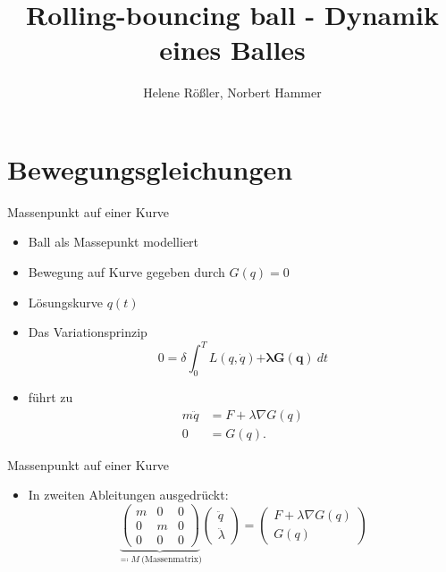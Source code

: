 \documentclass[aspectratio=169]{beamer}
\title{Rolling-bouncing ball - Dynamik eines Balles}
\author{Helene Rößler, Norbert Hammer}
\date{}
\begin{document}
\maketitle

\section{Bewegungsgleichungen}

\begin{frame}{Massenpunkt auf einer Kurve}
\begin{itemize}
    \item Ball als Massepunkt modelliert
    \item Bewegung auf Kurve gegeben durch $G(q)=0$
    \item Lösungskurve $q(t)$
    \item Das Variationsprinzip
    \begin{equation*}
        0 = \delta \int_0^T L(q, \dot{q}) \boldsymbol{ + \lambda G(q)} \ dt
    \end{equation*}
    \item führt zu
        \begin{align*}
            m \ddot{q} &= F + \lambda \nabla G(q)\\
            0 &= G(q).
        \end{align*}
\end{itemize}
\end{frame}

\begin{frame}{Massenpunkt auf einer Kurve}
\begin{itemize}
    \item In zweiten Ableitungen ausgedrückt:
        \begin{equation*}
        \underbrace{
        \begin{pmatrix}
          m & 0 & 0 \\
          0 & m & 0 \\
          0 & 0 & 0
        \end{pmatrix}}_{\eqcolon M ~ \text{(Massenmatrix)}}
        \begin{pmatrix} \ddot{q} \\ \ddot{\lambda} \end{pmatrix} =
        \begin{pmatrix}
          F + \lambda \nabla G(q)\\
          G(q)
        \end{pmatrix}
        \end{equation*}
\end{itemize}
\end{frame}
\end{document}
